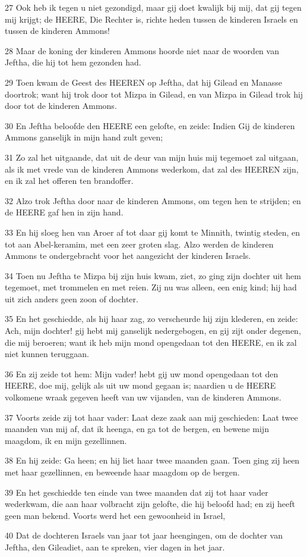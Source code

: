 \par 27 Ook heb ik tegen u niet gezondigd, maar gij doet kwalijk bij mij, dat gij tegen mij krijgt; de HEERE, Die Rechter is, richte heden tussen de kinderen Israels en tussen de kinderen Ammons!
\par 28 Maar de koning der kinderen Ammons hoorde niet naar de woorden van Jeftha, die hij tot hem gezonden had.
\par 29 Toen kwam de Geest des HEEREN op Jeftha, dat hij Gilead en Manasse doortrok; want hij trok door tot Mizpa in Gilead, en van Mizpa in Gilead trok hij door tot de kinderen Ammons.
\par 30 En Jeftha beloofde den HEERE een gelofte, en zeide: Indien Gij de kinderen Ammons ganselijk in mijn hand zult geven;
\par 31 Zo zal het uitgaande, dat uit de deur van mijn huis mij tegemoet zal uitgaan, als ik met vrede van de kinderen Ammons wederkom, dat zal des HEEREN zijn, en ik zal het offeren ten brandoffer.
\par 32 Alzo trok Jeftha door naar de kinderen Ammons, om tegen hen te strijden; en de HEERE gaf hen in zijn hand.
\par 33 En hij sloeg hen van Aroer af tot daar gij komt te Minnith, twintig steden, en tot aan Abel-keramim, met een zeer groten slag. Alzo werden de kinderen Ammons te ondergebracht voor het aangezicht der kinderen Israels.
\par 34 Toen nu Jeftha te Mizpa bij zijn huis kwam, ziet, zo ging zijn dochter uit hem tegemoet, met trommelen en met reien. Zij nu was alleen, een enig kind; hij had uit zich anders geen zoon of dochter.
\par 35 En het geschiedde, als hij haar zag, zo verscheurde hij zijn klederen, en zeide: Ach, mijn dochter! gij hebt mij ganselijk nedergebogen, en gij zijt onder degenen, die mij beroeren; want ik heb mijn mond opengedaan tot den HEERE, en ik zal niet kunnen teruggaan.
\par 36 En zij zeide tot hem: Mijn vader! hebt gij uw mond opengedaan tot den HEERE, doe mij, gelijk als uit uw mond gegaan is; naardien u de HEERE volkomene wraak gegeven heeft van uw vijanden, van de kinderen Ammons.
\par 37 Voorts zeide zij tot haar vader: Laat deze zaak aan mij geschieden: Laat twee maanden van mij af, dat ik heenga, en ga tot de bergen, en bewene mijn maagdom, ik en mijn gezellinnen.
\par 38 En hij zeide: Ga heen; en hij liet haar twee maanden gaan. Toen ging zij heen met haar gezellinnen, en beweende haar maagdom op de bergen.
\par 39 En het geschiedde ten einde van twee maanden dat zij tot haar vader wederkwam, die aan haar volbracht zijn gelofte, die hij beloofd had; en zij heeft geen man bekend. Voorts werd het een gewoonheid in Israel,
\par 40 Dat de dochteren Israels van jaar tot jaar heengingen, om de dochter van Jeftha, den Gileadiet, aan te spreken, vier dagen in het jaar.

